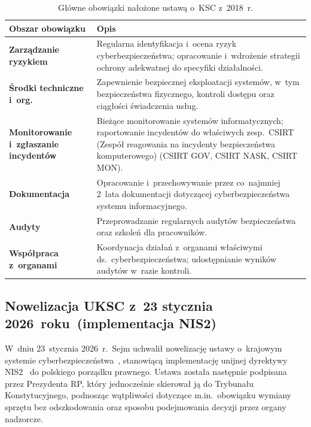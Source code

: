 \begin{table}[H]
\centering
\caption{Główne obowiązki nałożone ustawą o~KSC z~2018~r.}
\label{tab:ksc_obowiazki}
\begin{tabular}{>{\bfseries}p{4cm} p{9.5cm}}
\hline
Obszar obowiązku & Opis \\
\hline
Zarządzanie ryzykiem
  & Regularna identyfikacja i~ocena ryzyk cyberbezpieczeństwa; opracowanie
    i~wdrożenie strategii ochrony adekwatnej do specyfiki działalności. \\[4pt]
Środki techniczne i~org.
  & Zapewnienie bezpiecznej eksploatacji systemów, w~tym bezpieczeństwa
    fizycznego, kontroli dostępu oraz ciągłości świadczenia usług. \\[4pt]
Monitorowanie i~zgłaszanie incydentów
  & Bieżące monitorowanie systemów informatycznych; raportowanie
    incydentów do właściwych zesp.\ CSIRT (Zespół reagowania na incydenty bezpieczeństwa komputerowego)
    (CSIRT GOV, CSIRT NASK, CSIRT MON). \\[4pt]
Dokumentacja
  & Opracowanie i~przechowywanie przez co~najmniej 2~lata dokumentacji
    dotyczącej cyberbezpieczeństwa systemu informacyjnego. \\[4pt]
Audyty
  & Przeprowadzanie regularnych audytów bezpieczeństwa oraz szkoleń
    dla pracowników. \\[4pt]
Współpraca z~organami
  & Koordynacja działań z~organami właściwymi ds.\ cyberbezpieczeństwa;
    udostępnianie wyników audytów w~razie kontroli. \\
\hline
\end{tabular}
\end{table}

\subsection{Nowelizacja UKSC z~23 stycznia 2026~roku\ (implementacja NIS2)}

W~dniu 23~stycznia 2026~r.\ Sejm uchwalił nowelizację ustawy o~krajowym systemie cyberbezpieczeństwa~\autocite{uksc2026}, stanowiącą implementację
unijnej dyrektywy NIS2~\autocite{dyrektywa_nis2} do polskiego porządku prawnego. Ustawa została następnie podpisana przez Prezydenta RP, który jednocześnie
skierował ją do Trybunału Konstytucyjnego, podnosząc wątpliwości dotyczące m.in.\ obowiązku wymiany sprzętu bez odszkodowania oraz sposobu podejmowania
decyzji przez organy nadzorcze.

